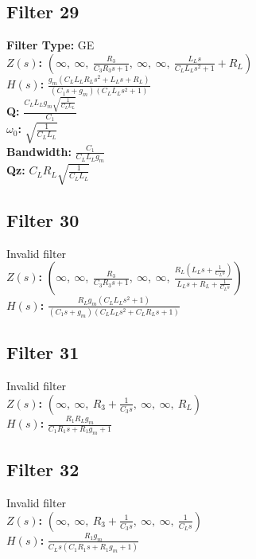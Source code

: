 \documentclass{article}
\begin{document}
\subsection*{Filter 29}
\textbf{Filter Type:} GE \\ 
\textbf{$Z(s)$:} $\left( \infty, \  \infty, \  \frac{R_{3}}{C_{3} R_{3} s + 1}, \  \infty, \  \infty, \  \frac{L_{L} s}{C_{L} L_{L} s^{2} + 1} + R_{L}\right)$ \\ 
\textbf{$H(s)$:} $\frac{g_{m} \left(C_{L} L_{L} R_{L} s^{2} + L_{L} s + R_{L}\right)}{\left(C_{1} s + g_{m}\right) \left(C_{L} L_{L} s^{2} + 1\right)}$ \\ 
\textbf{Q:} $\frac{C_{L} L_{L} g_{m} \sqrt{\frac{1}{C_{L} L_{L}}}}{C_{1}}$ \\ 
\textbf{$\omega_0$:} $\sqrt{\frac{1}{C_{L} L_{L}}}$ \\ 
\textbf{Bandwidth:} $\frac{C_{1}}{C_{L} L_{L} g_{m}}$ \\ 
\textbf{Qz:} $C_{L} R_{L} \sqrt{\frac{1}{C_{L} L_{L}}}$ \\ 
\subsection*{Filter 30}
Invalid filter \\ 
\textbf{$Z(s)$:} $\left( \infty, \  \infty, \  \frac{R_{3}}{C_{3} R_{3} s + 1}, \  \infty, \  \infty, \  \frac{R_{L} \left(L_{L} s + \frac{1}{C_{L} s}\right)}{L_{L} s + R_{L} + \frac{1}{C_{L} s}}\right)$ \\ 
\textbf{$H(s)$:} $\frac{R_{L} g_{m} \left(C_{L} L_{L} s^{2} + 1\right)}{\left(C_{1} s + g_{m}\right) \left(C_{L} L_{L} s^{2} + C_{L} R_{L} s + 1\right)}$ \\ 
\subsection*{Filter 31}
Invalid filter \\ 
\textbf{$Z(s)$:} $\left( \infty, \  \infty, \  R_{3} + \frac{1}{C_{3} s}, \  \infty, \  \infty, \  R_{L}\right)$ \\ 
\textbf{$H(s)$:} $\frac{R_{1} R_{L} g_{m}}{C_{1} R_{1} s + R_{1} g_{m} + 1}$ \\ 
\subsection*{Filter 32}
Invalid filter \\ 
\textbf{$Z(s)$:} $\left( \infty, \  \infty, \  R_{3} + \frac{1}{C_{3} s}, \  \infty, \  \infty, \  \frac{1}{C_{L} s}\right)$ \\ 
\textbf{$H(s)$:} $\frac{R_{1} g_{m}}{C_{L} s \left(C_{1} R_{1} s + R_{1} g_{m} + 1\right)}$ \\ 
\end{document}
